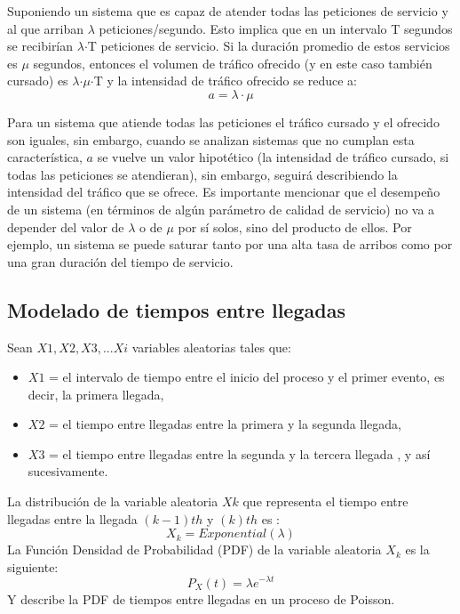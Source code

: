 Suponiendo un sistema que es capaz de atender todas las peticiones de servicio y al que arriban $\lambda$ peticiones/segundo. Esto implica que en un intervalo T segundos se recibirían $\lambda$$\cdot$T peticiones de servicio. Si la duración promedio de estos servicios es $\mu$ segundos, entonces el volumen de tráfico ofrecido (y en este caso también cursado) es $\lambda$$\cdot$$\mu$$\cdot$T y la intensidad de tráfico ofrecido se reduce a:
\begin{equation}
    a=\lambda\cdot\mu
    \label{eqn:a}
\end{equation}

Para un sistema que atiende todas las peticiones el tráfico cursado y el ofrecido son iguales, sin embargo, cuando se analizan sistemas que no cumplan esta característica, $a$ se vuelve un valor hipotético (la intensidad de tráfico cursado, si todas las peticiones se atendieran), sin embargo, seguirá describiendo la intensidad del tráfico que se ofrece. Es importante mencionar que el desempeño de un sistema (en términos de algún parámetro de calidad de servicio) no va a depender del valor de $\lambda$ o de $\mu$ por sí solos, sino del producto de ellos. Por ejemplo, un sistema se puede saturar tanto por una alta tasa de arribos como por una gran duración del tiempo de servicio.\newline

\subsection{Modelado de tiempos entre llegadas}

Sean $X1, X2, X3, ... Xi$ variables aleatorias tales que:
\begin{itemize}
    \item $X1$ = el intervalo de tiempo entre el inicio del proceso y el primer evento, es decir, la primera llegada,
    \item $X2$ = el tiempo entre llegadas entre la primera y la segunda llegada,
    \item $X3$ = el tiempo entre llegadas entre la segunda y la tercera llegada , y así sucesivamente.
\end{itemize}
La distribución de la variable aleatoria $Xk$ que representa el tiempo entre llegadas entre la llegada $(k-1) th$ y $(k) th$ es \parencite{PoissonMedium}:
\begin{equation}
    X_{k}=Exponential(\lambda)
    \label{eqn:expon}
\end{equation}
La Función Densidad de Probabilidad (PDF) de la variable aleatoria $X_{k}$ es la siguiente:
\begin{equation}
    P_{X}(t)=\lambda e^{-\lambda t}
    \label{eqn:pdfexpon}
\end{equation}
Y describe la PDF de tiempos entre llegadas en un proceso de Poisson.\newline

